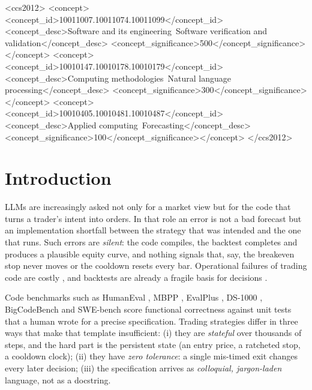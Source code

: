 \documentclass[sigconf,nonacm]{acmart}
\begin{document}
\begin{CCSXML}
<ccs2012>
<concept><concept_id>10011007.10011074.10011099</concept_id>
<concept_desc>Software and its engineering~Software verification and validation</concept_desc>
<concept_significance>500</concept_significance></concept>
<concept><concept_id>10010147.10010178.10010179</concept_id>
<concept_desc>Computing methodologies~Natural language processing</concept_desc>
<concept_significance>300</concept_significance></concept>
<concept><concept_id>10010405.10010481.10010487</concept_id>
<concept_desc>Applied computing~Forecasting</concept_desc>
<concept_significance>100</concept_significance></concept>
</ccs2012>
\end{CCSXML}

\maketitle

\section{Introduction}
LLMs are increasingly asked not only for a market view \cite{lopezlira2023chatgpt,wu2023bloomberggpt,yang2023fingpt}
but for the code that turns a trader's intent into orders. In that role an error is not a bad
forecast but an implementation shortfall \cite{perold1988implementation} between the strategy that
was intended and the one that runs. Such errors are \emph{silent}: the code compiles, the backtest
completes and produces a plausible equity curve, and nothing signals that, say, the breakeven stop
never moves or the cooldown resets every bar. Operational failures of trading code are costly
\cite{sec2013knight}, and backtests are already a fragile basis for decisions \cite{bailey2014pseudo,bailey2016pbo}.

Code benchmarks such as HumanEval \cite{chen2021humaneval}, MBPP \cite{austin2021mbpp},
EvalPlus \cite{liu2023evalplus}, DS-1000 \cite{lai2023ds1000}, BigCodeBench \cite{zhuo2024bigcodebench}
and SWE-bench \cite{jimenez2024swebench} score functional correctness against unit tests that a
human wrote for a precise specification. Trading strategies differ in three ways that make that
template insufficient: (i) they are \emph{stateful} over thousands of steps, and the hard part is
the persistent state (an entry price, a ratcheted stop, a cooldown clock); (ii) they have
\emph{zero tolerance}: a single mis-timed exit changes every later decision; (iii) the
specification arrives as \emph{colloquial, jargon-laden} language, not as a docstring.
\end{document}
